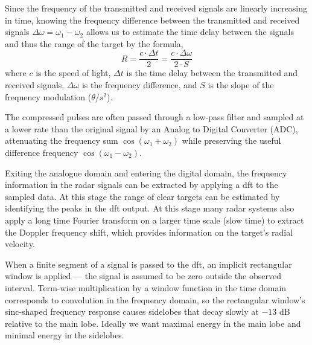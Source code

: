 Since the frequency of the transmitted and received signals are linearly increasing in time, knowing
the frequency difference between the transmitted and received signals \(\Delta \omega = \omega_1-\omega_2\) allows us 
to estimate the time delay between the signals and thus the range of the target by the formula,
\begin{equation}
    R = \frac{c \cdot \Delta t}{2} = \frac
{c \cdot \Delta \omega}{2 \cdot S}
\end{equation}
where \(c\) is the speed of light, \(\Delta t\) is the time delay between the transmitted and 
received signals, \(\Delta \omega\) is the frequency difference, and \(S\) is the slope of the frequency 
modulation (\(\theta\)/\(s^2\)). 


The compressed pulses are often passed through a low-pass filter and sampled at a lower 
rate than the original signal by an Analog to Digital Converter (ADC), attenuating the frequency 
sum \(\cos(\omega_1+\omega_2)\) while preserving the useful difference frequency 
\(\cos(\omega_1-\omega_2)\).  

Exiting the analogue domain and entering the digital domain, the frequency information in the 
radar signals can be extracted by applying a \gls{dft} to the sampled data.
At this stage the range of clear targets can be estimated by identifying the peaks in the \gls{dft} output.
At this stage many radar systems also apply a long time Fourier transform on a larger time scale 
(slow time) to extract the Doppler frequency shift, which provides information on the target's
radial velocity. 

When a finite segment of a signal is passed to the \gls{dft}, an implicit rectangular window 
is applied --- the signal is assumed to be zero outside the observed interval. Term-wise 
multiplication by a window function in the time domain corresponds to convolution in the
frequency domain, so the rectangular window's sinc-shaped frequency response causes 
sidelobes that decay slowly at $-13$ dB relative to the main 
lobe. Ideally we want maximal energy in the main lobe and minimal energy in the sidelobes.

